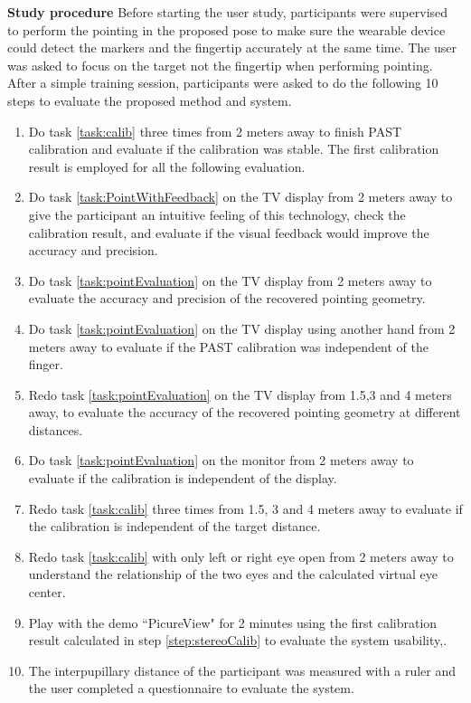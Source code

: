 \textbf{Study procedure} Before starting the user study, participants were supervised to perform the pointing in the proposed pose to make sure the wearable device could detect the markers and the fingertip accurately at the same time. The user was asked to focus on the target not the fingertip when performing pointing. After a simple training session, participants were asked to do the following 10 steps to evaluate the proposed method and system.
\begin{enumerate}%
	\item \label{step:stereoCalib} Do task \ref{task:calib} three times from 2 meters away to finish PAST calibration and evaluate if the calibration was stable. The first calibration result is employed for all the following evaluation.
	\item \label{step:pointWithFeedback} Do task \ref{task:PointWithFeedback} on the TV display from 2 meters away to give the participant an intuitive feeling of this technology, check the calibration result, and evaluate if the visual feedback would improve the accuracy and precision.
	\item \label{step:pointingEvaluation} Do task \ref{task:pointEvaluation} on the TV display from 2 meters away to evaluate the accuracy and precision of the recovered pointing geometry.
	\item \label{step:diffentHand} Do task \ref{task:pointEvaluation} on the TV display using another hand from 2 meters away to evaluate if the PAST calibration was independent of the finger.
	\item \label{step:distanceEvaluation} Redo task \ref{task:pointEvaluation} on the TV display from 1.5,3 and 4  meters away, to evaluate the accuracy of the recovered pointing geometry at different distances.
	\item \label{step:differentScreenEvaluation}  Do task \ref{task:pointEvaluation} on the monitor from 2 meters away to evaluate if the calibration is independent of the display.
	\item \label{step:calibDifferentDistance} Redo task \ref{task:calib} three times from 1.5, 3 and 4 meters away to evaluate if the calibration is independent of the target distance. 
	\item \label{step:calibOneEye} Redo task \ref{task:calib} with only left or right eye open from 2 meters away to understand the relationship of the two eyes and the calculated virtual eye center. 
	\item \label{step:pictureview} Play with the demo ``PicureView" for 2 minutes using the first calibration result calculated in step \ref{step:stereoCalib} to evaluate the system usability,.
	\item \label{step:questionnaire} The interpupillary distance of the participant was measured with a ruler and the user completed a questionnaire to evaluate the system.
\end{enumerate}

